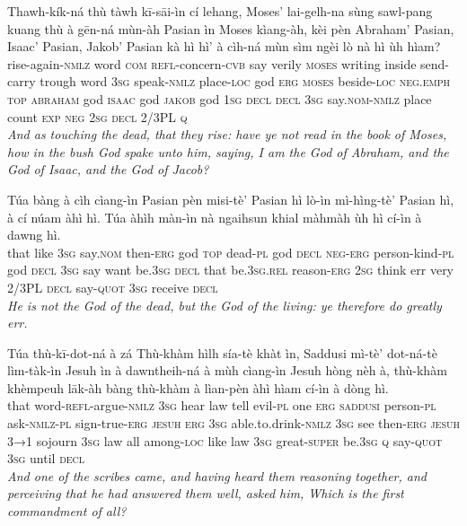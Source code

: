 \documentclass[11pt,a4paper]{article}
\begin{document}
\begin{exe}
\gll Thawh-kík-ná thù tàwh kī-sāi-ìn cí lehang, Moses' lai-gelh-na sùng sawl-pang kuang thù à gēn-ná mùn-àh Pasian ìn Moses kìang-àh, kèi pèn Abraham' Pasian, Isaac' Pasian, Jakob' Pasian kà hì hì' à cìh-ná mùn sìm ngèi lò nà hì ùh hìam? \\
     rise-again-\textsc{nmlz} word \textsc{com} \textsc{refl}-concern-\textsc{cvb} say verily \textsc{moses} writing inside send-carry trough word \textsc{3sg} speak-\textsc{nmlz} place-\textsc{loc} god \textsc{erg} \textsc{moses} beside-\textsc{loc} \textsc{neg}.\textsc{emph} \textsc{top} \textsc{abraham} god \textsc{isaac} god \textsc{jakob} god \textsc{1sg} \textsc{decl} \textsc{decl} \textsc{3sg} say.\textsc{nom}-\textsc{nmlz} place count \textsc{exp} \textsc{neg} \textsc{2sg} \textsc{decl} 2/3PL \textsc{q} \\
\glt \textcolor{kjvcolor}{\textit{And as touching the dead, that they rise: have ye not read in the book of Moses, how in the bush God spake unto him, saying, I am the God of Abraham, and the God of Isaac, and the God of Jacob?}}

\gll Túa bàng à cìh cìang-ìn Pasian pèn misi-tè' Pasian hì lò-ìn mì-hìng-tè' Pasian hì, à cí núam àhì hì. Túa àhìh màn-ìn nà ngaihsun khial màhmàh ùh hì cí-ìn à dawng hì. \\
     that like \textsc{3sg} say.\textsc{nom} then-\textsc{erg} god \textsc{top} dead-\textsc{pl} god \textsc{decl} \textsc{neg}-\textsc{erg} person-kind-\textsc{pl} god \textsc{decl} \textsc{3sg} say want be.\textsc{3sg} \textsc{decl} that be.\textsc{3sg}.\textsc{rel} reason-\textsc{erg} \textsc{2sg} think err very 2/3PL \textsc{decl} say-\textsc{quot} \textsc{3sg} receive \textsc{decl} \\
\glt \textcolor{kjvcolor}{\textit{He is not the God of the dead, but the God of the living: ye therefore do greatly err.}}

\gll Túa thù-kī-dot-ná à zá Thù-khàm hìlh sía-tè khàt ìn, Saddusi mì-tè' dot-ná-tè lìm-tàk-ìn Jesuh ìn à dawntheih-ná à mùh cìang-ìn Jesuh hòng nèh à, thù-khàm khèmpeuh lāk-àh bàng thù-khàm à lìan-pèn àhì hìam cí-ìn à dòng hì. \\
     that word-\textsc{refl}-argue-\textsc{nmlz} \textsc{3sg} hear law tell evil-\textsc{pl} one \textsc{erg} \textsc{saddusi} person-\textsc{pl} ask-\textsc{nmlz}-\textsc{pl} sign-true-\textsc{erg} \textsc{jesuh} \textsc{erg} \textsc{3sg} able.to.drink-\textsc{nmlz} \textsc{3sg} see then-\textsc{erg} \textsc{jesuh} \textsc{3→1} sojourn \textsc{3sg} law all among-\textsc{loc} like law \textsc{3sg} great-\textsc{super} be.\textsc{3sg} \textsc{q} say-\textsc{quot} \textsc{3sg} until \textsc{decl} \\
\glt \textcolor{kjvcolor}{\textit{And one of the scribes came, and having heard them reasoning together, and perceiving that he had answered them well, asked him, Which is the first commandment of all?}}


\end{exe}
\end{document}
